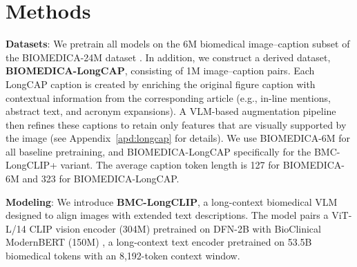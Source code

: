 \section{Methods}
\label{sec:methods}

\textbf{Datasets}: 
We pretrain all models on the 6M biomedical image–caption subset of the BIOMEDICA-24M dataset \cite{lozano2025biomedica}. 
In addition, we construct a derived dataset, \textbf{BIOMEDICA-LongCAP}, consisting of 1M image–caption pairs. 
Each LongCAP caption is created by enriching the original figure caption with contextual information from the corresponding article (e.g., in-line mentions, abstract text, and acronym expansions).
A VLM-based augmentation pipeline then refines these captions to retain only features that are visually supported by the image (see Appendix~\ref{apd:longcap} for details). 
We use BIOMEDICA-6M for all baseline pretraining, and BIOMEDICA-LongCAP specifically for the BMC-LongCLIP+ variant. The average caption token length is 127 for BIOMEDICA-6M and 323 for BIOMEDICA-LongCAP.




\textbf{Modeling}: We introduce \textbf{BMC-LongCLIP}, a long-context biomedical VLM designed to align images with extended text descriptions. The model pairs a ViT-L/14 CLIP vision encoder (304M) pretrained on DFN-2B \cite{DFN} with BioClinical ModernBERT (150M) \cite{bioclinicalmodernbert}, a long-context text encoder pretrained on 53.5B biomedical tokens with an 8,192-token context window.




